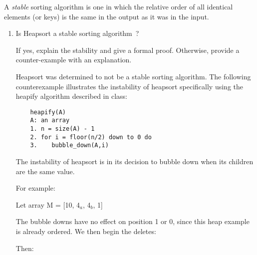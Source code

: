 \documentclass[12pt]{article}
\begin{document}
A \emph{stable} sorting algorithm is one in which the relative order of all
identical elements (or keys) is the same in the output as it was in the input.
\begin{enumerate}
  \item Is Heapsort a stable sorting algorithm~?
  
  If yes, explain the stability and give a formal proof. Otherwise, provide a
  counter-example with an explanation.

  Heapsort was determined to not be a stable sorting algorithm. The following counterexample illustrates the instability of heapsort specifically using the heapify algorithm described in class:

  \begin{verbatim}
    heapify(A)
    A: an array
    1. n = size(A) - 1
    2. for i = floor(n/2) down to 0 do
    3.    bubble_down(A,i)
  \end{verbatim}

  The instability of heapsort is in its decision to bubble down when its children are
  the same value.

  For example:

  Let array M = [10, 4$_a$, 4$_b$, 1]

  The bubble downs have no effect on position 1 or 0, since this heap example is already ordered. We then begin the deletes:

  \begin{center}\end{center}

Then:

\begin{center}\end{center}


\end{enumerate}
\end{document}
